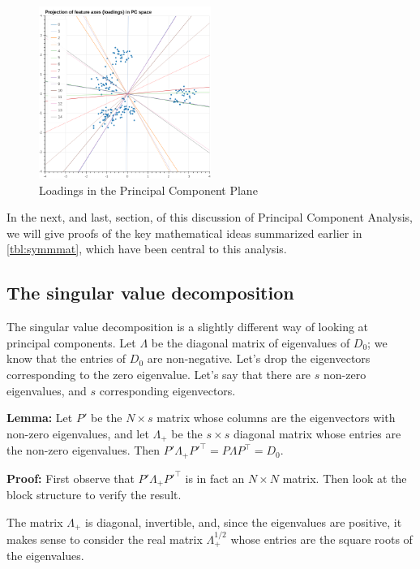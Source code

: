 \documentclass[
  oneside]{scrbook}
\begin{document}
\begin{figure}
\hypertarget{fig:loadings}{%
\centering
\includegraphics[width=0.5\textwidth,height=\textheight]{img/loading.png}
\caption{Loadings in the Principal Component Plane}\label{fig:loadings}
}
\end{figure}

In the next, and last, section, of this discussion of Principal
Component Analysis, we will give proofs of the key mathematical ideas
summarized earlier in \cref{tbl:symmmat}, which have been central to
this analysis.

\hypertarget{sec:svd}{%
\subsection{The singular value decomposition}\label{sec:svd}}

The singular value decomposition is a slightly different way of looking
at principal components. Let \(\Lambda\) be the diagonal matrix of
eigenvalues of \(D_{0}\); we know that the entries of \(D_{0}\) are
non-negative. Let's drop the eigenvectors corresponding to the zero
eigenvalue. Let's say that there are \(s\) non-zero eigenvalues, and
\(s\) corresponding eigenvectors.

\textbf{Lemma:} Let \(P'\) be the \(N\times s\) matrix whose columns are
the eigenvectors with non-zero eigenvalues, and let \(\Lambda_{+}\) be
the \(s\times s\) diagonal matrix whose entries are the non-zero
eigenvalues. Then
\(P'\Lambda_{+} P'^{\intercal} = P\Lambda P^{\intercal} = D_{0}\).

\textbf{Proof:} First observe that \(P'\Lambda_{+}P'^{\intercal}\) is in
fact an \(N\times N\) matrix. Then look at the block structure to verify
the result.

The matrix \(\Lambda_{+}\) is diagonal, invertible, and, since the
eigenvalues are positive, it makes sense to consider the real matrix
\(\Lambda_{+}^{1/2}\) whose entries are the square roots of the
eigenvalues.
\end{document}
